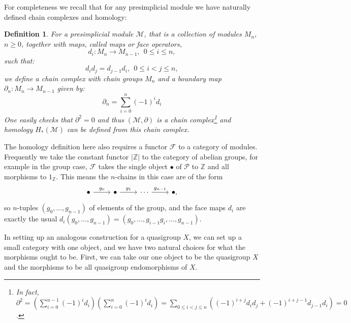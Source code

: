 \documentclass[11pt]{amsart}
\newtheorem{definition}[theorem]{Definition}
\theoremstyle{definition}
\newcommand{\Z}{\mathbb{Z}}
\begin{document}
For completeness we recall that for any presimplicial module we have naturally defined chain complexes and homology:
\begin{definition} For a presimplicial module ${\mathcal M}$, that is a collection of modules $M_n$, $n\geq 0$, together with maps,
called  maps or face operators,
$$d_i: M_n \to  M_{n-1}, \ \ 0\leq i \leq n, $$
such that:
$$d_id_j = d_{j-1}d_i,\ \ 0\leq i < j \leq n, $$
we define a chain complex with chain groups $M_n$ and a boundary map $\partial_n: M_n \to M_{n-1}$ given by:
$$\partial_n=\sum_{i=0}^n (-1)^i d_i$$
One easily checks that $\partial^2=0$ and thus $({\mathcal M},\partial)$ is a chain complex\footnote{In fact,
$\partial^2= (\sum_{i=0}^{n-1} (-1)^i d_i)(\sum_{i=0}^n (-1)^i d_i)=
 \sum_{0\leq i<j\leq n} ((-1)^{i+j}d_id_j + (-1)^{i+j-1}d_{j-1}d_i)=0$.}
and homology $H_*({\mathcal M})$ can be defined from this chain complex.
\end{definition}

The homology definition here also requires a functor $\mathcal{F}$ to a category of modules. Frequently we take the constant functor $|\Z|$ to the category of abelian groups, for example in the group case, $\mathcal{F}$ takes the single object $\bullet$ of $\mathcal{P}$ to $\Z$ and all morphisms to $1_\Z$. This means the $n$-chains in this case are of the form \[ \begin{tikzcd}
    \bullet \arrow[r, "g_0"] & \bullet \arrow[r, "g_1"] & \cdots \arrow[r, "g_{n - 1}"] & \bullet,
\end{tikzcd} \] so $n$-tuples $(g_0, \dots, g_{n - 1})$ of elements of the group, and the face maps $d_i$ are exactly the usual $d_i(g_0, \dots, g_{n - 1}) = (g_0, \dots, g_{i - 1} g_i, \dots, g_{n - 1})$. 

In setting up an analogous construction for a quasigroup $X$, we can set up a small category with one object, and we have two natural choices for what the morphisms ought to be. First, we can take our one object to be the quasigroup $X$ and the morphisms to be all quasigroup endomorphisms of $X$. 
\end{document}
